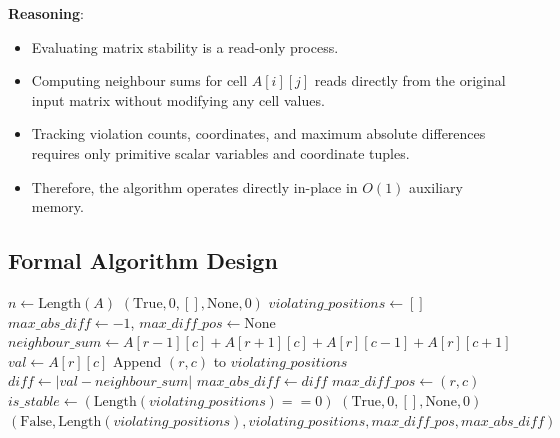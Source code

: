 \textbf{Reasoning}:
\begin{itemize}
    \item Evaluating matrix stability is a read-only process.
    \item Computing neighbour sums for cell $A[i][j]$ reads directly from the original input matrix without modifying any cell values.
    \item Tracking violation counts, coordinates, and maximum absolute differences requires only primitive scalar variables and coordinate tuples.
    \item Therefore, the algorithm operates directly in-place in $O(1)$ auxiliary memory.
\end{itemize}

\subsection{Formal Algorithm Design}

\begin{algorithm}[H]
\caption{Stable Matrix Evaluation and Violation Tracking}
\begin{algorithmic}[1]
    \State $n \gets \text{Length}(A)$
        \State \Return $(\text{True}, 0, [], \text{None}, 0)$ 
    \EndIf
    \State $violating\_positions \gets []$
    \State $max\_abs\_diff \gets -1$, $max\_diff\_pos \gets \text{None}$
     
            \State $neighbour\_sum \gets A[r-1][c] + A[r+1][c] + A[r][c-1] + A[r][c+1]$
            \State $val \gets A[r][c]$
                \State Append $(r, c)$ to $violating\_positions$
                \State $diff \gets |val - neighbour\_sum|$
                    \State $max\_abs\_diff \gets diff$
                    \State $max\_diff\_pos \gets (r, c)$
                \EndIf
            \EndIf
        \EndFor
    \EndFor
    \State $is\_stable \gets (\text{Length}(violating\_positions) == 0)$
        \State \Return $(\text{True}, 0, [], \text{None}, 0)$
    \Else
        \State \Return $(\text{False}, \text{Length}(violating\_positions), violating\_positions, max\_diff\_pos, max\_abs\_diff)$
    \EndIf
\EndFunction
\end{algorithmic}
\end{algorithm}

